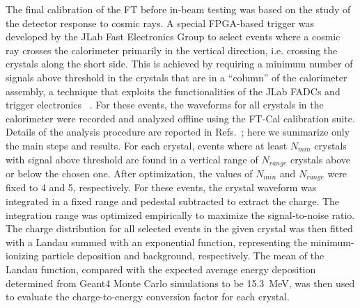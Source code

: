 The final calibration of the FT before in-beam testing was based on the study of the detector response to cosmic
rays. A special FPGA-based trigger was developed by the JLab Fast Electronics Group to select events where a
cosmic ray crosses the calorimeter primarily in the vertical direction, i.e. crossing the crystals along the short side.
This is achieved by requiring a minimum number of signals above threshold in the crystals that are in a ``column'' of
the calorimeter assembly, a technique that exploits the functionalities of the JLab FADCs and trigger electronics
~\cite{daq,trigger}. For these events, the waveforms for all crystals in the calorimeter were recorded and analyzed
offline using the FT-Cal calibration suite. Details of the analysis procedure are reported in
Refs.~\cite{cosmics1,cosmics2}; here we summarize only the main steps and results. For each crystal, events where
at least $N_{min}$ crystals with signal above threshold are found in a vertical range of $N_{range}$ crystals above or
below the chosen one. After optimization, the values of $N_{min}$ and $N_{range}$ were fixed to 4 and 5, respectively.
For these events, the crystal waveform was integrated in a fixed range and pedestal subtracted to extract the
charge. The integration range was optimized empirically to maximize the signal-to-noise ratio. The charge distribution
for all selected events in the given crystal was then fitted with a Landau summed with an exponential function,
representing the minimum-ionizing particle deposition and background, respectively. The mean of the Landau function,
compared with the expected average energy deposition determined from Geant4 Monte Carlo simulations to be
15.3~MeV, was then used to evaluate the charge-to-energy conversion factor for each crystal. 

